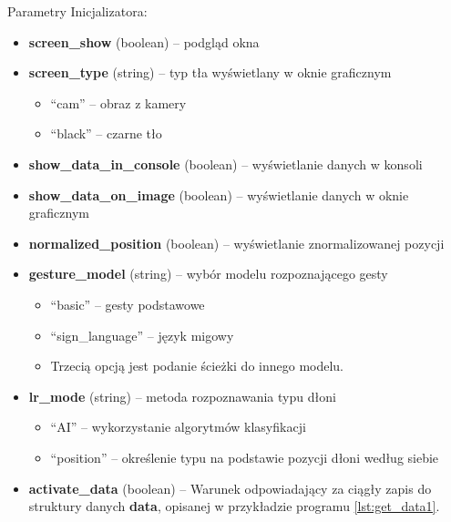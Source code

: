 Parametry Inicjalizatora:
\begin{itemize}
    \item \textbf{screen\_show} (boolean) -- podgląd okna
    \item \textbf{screen\_type} (string) -- typ tła wyświetlany w oknie graficznym
    \begin{itemize}
        \item \enquote{cam} -- obraz z kamery
        \item \enquote{black} -- czarne tło
    \end{itemize}
    \item \textbf{show\_data\_in\_console} (boolean) -- wyświetlanie danych w konsoli
    \item \textbf{show\_data\_on\_image} (boolean) -- wyświetlanie danych w oknie graficznym
    \item \textbf{normalized\_position} (boolean) -- wyświetlanie znormalizowanej pozycji
    \item \textbf{gesture\_model} (string) -- wybór modelu rozpoznającego gesty
    \begin{itemize}
        \item \enquote{basic} -- gesty podstawowe
        \item \enquote{sign\_language} -- język migowy
        \item Trzecią opcją jest podanie ścieżki do innego modelu.
    \end{itemize}
    \item \textbf{lr\_mode} (string) -- metoda rozpoznawania typu dłoni
    \begin{itemize}
        \item \enquote{AI} -- wykorzystanie algorytmów klasyfikacji
        \item \enquote{position} -- określenie typu na podstawie pozycji dłoni według siebie
    \end{itemize}
    \item \textbf{activate\_data} (boolean) -- Warunek odpowiadający za ciągły zapis do struktury danych \textbf{data}, opisanej w przykładzie programu \ref{lst:get_data1}.
\end{itemize}


